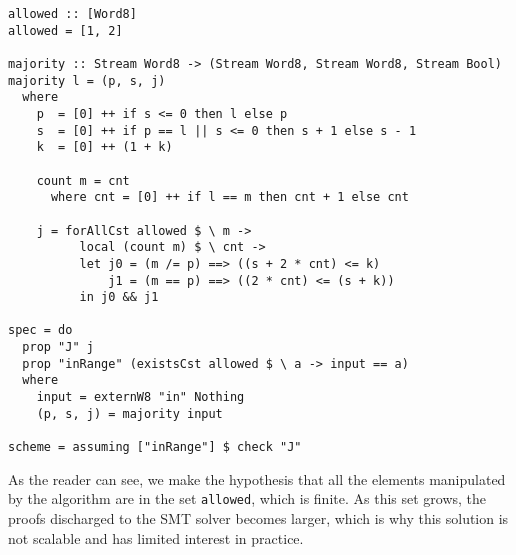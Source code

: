 \begin{lstlisting}[frame=single]
allowed :: [Word8]
allowed = [1, 2]

majority :: Stream Word8 -> (Stream Word8, Stream Word8, Stream Bool)
majority l = (p, s, j)
  where
    p  = [0] ++ if s <= 0 then l else p
    s  = [0] ++ if p == l || s <= 0 then s + 1 else s - 1
    k  = [0] ++ (1 + k)
    
    count m = cnt
      where cnt = [0] ++ if l == m then cnt + 1 else cnt
    
    j = forAllCst allowed $ \ m ->
          local (count m) $ \ cnt ->
          let j0 = (m /= p) ==> ((s + 2 * cnt) <= k)
              j1 = (m == p) ==> ((2 * cnt) <= (s + k))
          in j0 && j1

spec = do
  prop "J" j
  prop "inRange" (existsCst allowed $ \ a -> input == a)
  where
    input = externW8 "in" Nothing
    (p, s, j) = majority input

scheme = assuming ["inRange"] $ check "J"
\end{lstlisting}

As the reader can see, we make the hypothesis that all the elements
manipulated by the algorithm are in the set \texttt{allowed}, which is
finite. As this set grows, the proofs discharged to the SMT solver
becomes larger, which is why this solution
is not scalable and has limited interest in practice.
